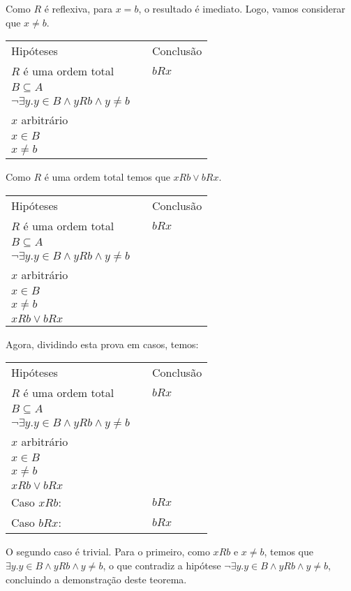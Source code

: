 Como $R$ é reflexiva, para $x = b$, o resultado é imediato. Logo,
vamos considerar que $x \neq b$.
\begin{flushleft}
\begin{tabular}{lcl}
 Hip\'oteses & \hspace{1cm} & Conclusão\\
$R$ é uma ordem total & & $b R x$\\
$B \subseteq A$ & & \\
$\neg \exists y. y\in B \land yRb \land y \neq b$\\
$x$ arbitrário & &\\
$x \in B$ & & \\
$x \neq b$ & & \\
 \end{tabular}
\end{flushleft}
Como $R$ é uma ordem total temos que $xRb \lor bRx$.
\begin{flushleft}
\begin{tabular}{lcl}
 Hip\'oteses & \hspace{1cm} & Conclusão\\
$R$ é uma ordem total & & $b R x$\\
$B \subseteq A$ & & \\
$\neg \exists y. y\in B \land yRb \land y \neq b$\\
$x$ arbitrário & &\\
$x \in B$ & & \\
$x \neq b$ & & \\
$xRb \lor bRx$ & &\\
 \end{tabular}
\end{flushleft}
Agora, dividindo esta prova em casos, temos:
\begin{flushleft}
\begin{tabular}{lcl}
 Hip\'oteses & \hspace{1cm} & Conclusão\\
$R$ é uma ordem total & & $b R x$\\
$B \subseteq A$ & & \\
$\neg \exists y. y\in B \land yRb \land y \neq b$\\
$x$ arbitrário & &\\
$x \in B$ & & \\
$x \neq b$ & & \\
$xRb \lor bRx$ & &\\
Caso $xRb$:   & & $bRx$ \\
Caso $bRx$:  & & $bRx$
 \end{tabular}
\end{flushleft}
O segundo caso é trivial. Para o primeiro, como $xRb$ e $x \neq b$,
temos que $\exists y. y\in B \land y R b \land y \neq b$, o que
contradiz a hipótese $\neg \exists y. y\in B \land yRb \land y \neq
b$, concluindo a demonstração deste teorema.

